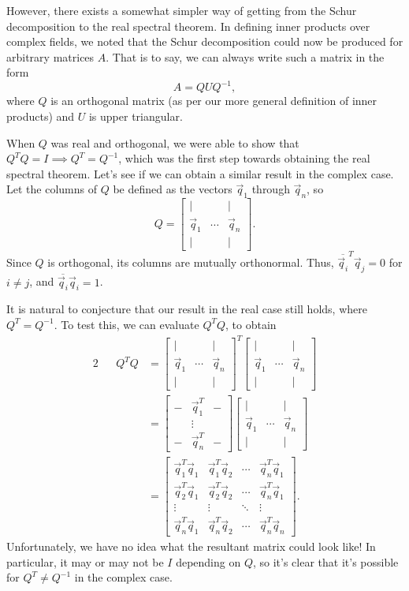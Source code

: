 \documentclass[letterpaper]{article}
\theoremstyle{remark}
\newcommand{\mat}[1]{\ensuremath{\begin{bmatrix}#1\end{bmatrix}}}
\newcommand{\eqn}[1]{\begin{alignat*}{2}#1\end{alignat*}}
\begin{document}
However, there exists a somewhat simpler way of getting from the Schur decomposition to the real spectral theorem. In defining inner products over complex fields, we noted that the Schur decomposition could now be produced for arbitrary matrices $A$. That is to say, we can always write such a matrix in the form
\[
    A = QUQ^{-1},
\]
where $Q$ is an orthogonal matrix (as per our more general definition of inner products) and $U$ is upper triangular.

When $Q$ was real and orthogonal, we were able to show that $Q^TQ = I \implies Q^T = Q^{-1}$, which was the first step towards obtaining the real spectral theorem. Let's see if we can obtain a similar result in the complex case. Let the columns of $Q$ be defined as the vectors $\vec{q}_1$ through $\vec{q}_n$, so
\[
    Q = \mat{| & & | \\ \vec{q}_1 & \cdots & \vec{q}_n \\ | & & |}.
\]
Since $Q$ is orthogonal, its columns are mutually orthonormal. Thus, $\overline{\vec{q}_i}^T\vec{q}_j = 0$ for $i \ne j$, and $\overline{\vec{q}_i}\vec{q}_i = 1$.

It is natural to conjecture that our result in the real case still holds, where $Q^T = Q^{-1}$. To test this, we can evaluate $Q^TQ$, to obtain
\eqn{
    && Q^TQ &= \mat{| & & | \\ \vec{q}_1 & \cdots & \vec{q}_n \\ | & & |}^T \mat{| & & | \\ \vec{q}_1 & \cdots & \vec{q}_n \\ | & & |} \\
    &&&= \mat{ - & \vec{q}_1^T & - \\ & \vdots & \\ - & \vec{q}_n^T & -}\mat{| & & | \\ \vec{q}_1 & \cdots & \vec{q}_n \\ | & & |} \\
    &&&= \mat{
    \vec{q}_1^T\vec{q}_1 & \vec{q}_1^T\vec{q}_2 & \cdots & \vec{q}_n^T\vec{q}_1 \\ 
    \vec{q}_2^T\vec{q}_1 & \vec{q}_2^T\vec{q}_2 & \cdots & \vec{q}_n^T\vec{q}_1 \\
    \vdots & \vdots & \ddots & \vdots \\
    \vec{q}_n^T\vec{q}_1 & \vec{q}_n^T\vec{q}_2 & \cdots & \vec{q}_n^T\vec{q}_n
    }.
}
Unfortunately, we have no idea what the resultant matrix could look like! In particular, it may or may not be $I$ depending on $Q$, so it's clear that it's possible for $Q^T \ne Q^{-1}$ in the complex case.
\end{document}
